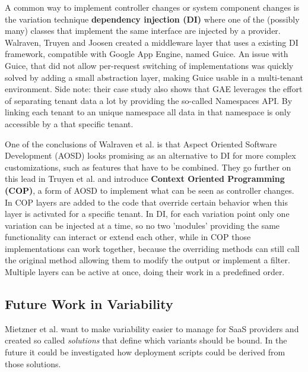 A common way to implement controller changes or system component changes is the variation technique \textbf{dependency injection (DI)} where one of the (possibly many) classes that implement the same interface are injected by a provider. 
Walraven, Truyen and Joosen \cite{walraven2011middleware} created a middleware layer that uses a existing DI framework, compatible with Google App Engine, named Guice. An issue with Guice, that did not allow per-request switching of implementations was quickly solved by adding a small abstraction layer, making Guice usable in a multi-tenant environment.
Side note: their case study also shows that GAE leverages the effort of separating tenant data a lot by providing the so-called Namespaces API. By linking each tenant to an unique namespace all data in that namespace is only accessible by a that specific tenant.

One of the conclusions of Walraven et al. is that Aspect Oriented Software Development (AOSD) looks promising as an alternative to DI for more complex customizations, such as features that have to be combined.
They go further on this lead in Truyen et al. \cite{truyen2012context} and introduce \textbf{Context Oriented Programming (COP)}, a form of AOSD to implement what can be seen as controller changes. 
In COP layers are added to the code that override certain behavior when this layer is activated for a specific tenant. 
In DI, for each variation point only one variation can be injected at a time, so no two 'modules' providing the same functionality can interact or extend each other, while in COP those implementations can work together, because the overriding methods can still call the original method allowing them to modify the output or implement a filter. 
Multiple layers can be active at once, doing their work in a predefined order. 

\subsection{Future Work in Variability}

Mietzner et al. \cite{mietzner2008defining} want to make variability easier to manage for SaaS providers and created so called \textit{solutions} that define which variants should be bound. In the future it could be investigated how deployment scripts could be derived from those solutions.


